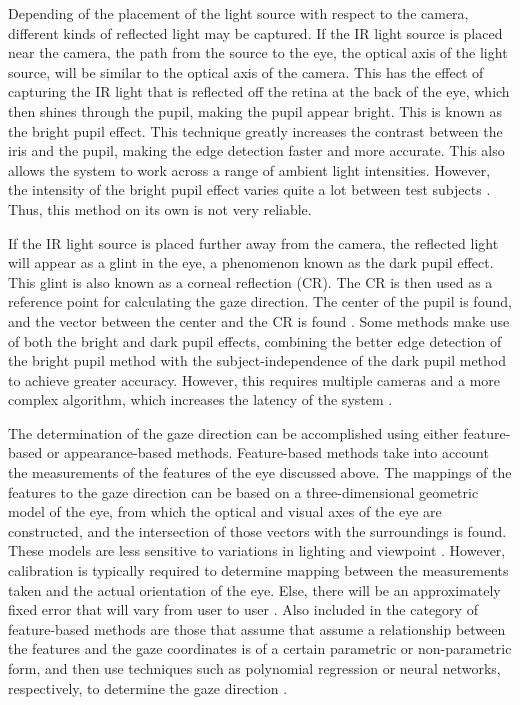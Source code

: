 \documentclass[12pt,conference,onecolumn]{IEEEtran}
\begin{document}
Depending of the placement of the light source with respect to the camera, different kinds of reflected light may be captured. If the IR light source is placed near the camera, the path from the source to the eye, the optical axis of the light source, will be similar to the optical axis of the camera. This has the effect of capturing the IR light that is reflected off the retina at the back of the eye, which then shines through the pupil, making the pupil appear bright. This is known as the bright pupil effect. This technique greatly increases the contrast between the iris and the pupil, making the edge detection faster and more accurate. This also allows the system to work across a range of ambient light intensities. However, the intensity of the bright pupil effect varies quite a lot between test subjects \cite{morimoto}. Thus, this method on its own is not very reliable.

If the IR light source is placed further away from the camera, the reflected light will appear as a glint in the eye, a phenomenon known as the dark pupil effect. This glint is also known as a corneal reflection (CR). The CR is then used as a reference point for calculating the gaze direction. The center of the pupil is found, and the vector between the center and the CR is found \cite{morimoto}. Some methods make use of both the bright and dark pupil effects, combining the better edge detection of the bright pupil method with the subject-independence of the dark pupil method to achieve greater accuracy. However, this requires multiple cameras and a more complex algorithm, which increases the latency of the system \cite{chennamma}. 

The determination of the gaze direction can be accomplished using either feature-based or appearance-based methods. Feature-based methods take into account the measurements of the features of the eye discussed above. The mappings of the features to the gaze direction can be based on a three-dimensional geometric model of the eye, from which the optical and visual axes of the eye are constructed, and the intersection of those vectors with the surroundings is found. These models are less sensitive to variations in lighting and viewpoint \cite{chennamma}. However, calibration is typically required to determine mapping between the measurements taken and the actual orientation of the eye. Else, there will be an approximately fixed error that will vary from user to user \cite{morimoto}. Also included in the category of feature-based methods are those that assume that assume a relationship between the features and the gaze coordinates is of a certain parametric or non-parametric form, and then use techniques such as polynomial regression or neural networks, respectively, to determine the gaze direction \cite{chennamma}.
\end{document}
